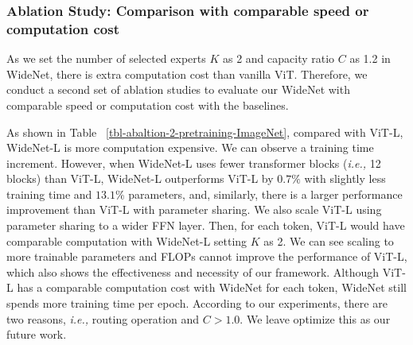 \documentclass[letterpaper]{article} %
\newcommand{\ie}{\emph{i.e.,}\xspace}
\def\revise{\textcolor{red}}
\begin{document}
\subsubsection{Ablation Study: Comparison with comparable speed or computation cost}
As we set the number of selected experts $K$ as 2 and capacity ratio $C$ as 1.2 in WideNet, there is extra computation cost than vanilla ViT. Therefore, we conduct a second set of ablation studies to evaluate our WideNet with comparable speed or computation cost with the baselines.  

As shown in Table ~\ref{tbl-abaltion-2-pretraining-ImageNet}, compared with ViT-L, WideNet-L is more computation expensive. We can observe a training time increment. However, when WideNet-L uses fewer transformer blocks (\ie 12 blocks) than ViT-L, WideNet-L outperforms ViT-L by $0.7\%$ with slightly less training time and $13.1\%$ parameters, and, similarly, there is a larger performance improvement than ViT-L with parameter sharing. We also scale ViT-L using parameter sharing to a wider FFN layer. Then, for each token, ViT-L would have comparable computation with WideNet-L setting $K$ as 2. We can see scaling to more trainable parameters and FLOPs cannot improve the performance of ViT-L, which also shows the effectiveness and necessity of our framework. Although ViT-L has a comparable computation cost with WideNet for each token, WideNet still spends more training time per epoch. According to our experiments, there are two reasons, \ie routing operation and $C > 1.0$. We leave optimize this as our future work.






\end{document}
